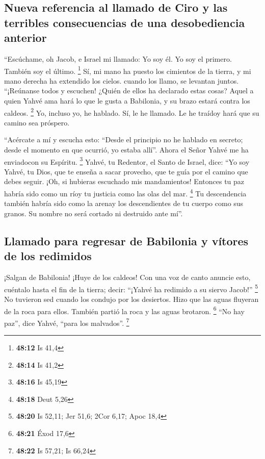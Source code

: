 \begin{paracol}{2}
\hypertarget{nueva-referencia-al-llamado-de-ciro-y-las-terribles-consecuencias-de-una-desobediencia-anterior}{%
\subsection{Nueva referencia al llamado de Ciro y las terribles
consecuencias de una desobediencia
anterior}\label{nueva-referencia-al-llamado-de-ciro-y-las-terribles-consecuencias-de-una-desobediencia-anterior}}

 ``Escúchame, oh Jacob, e Israel mi llamado: Yo soy él.
Yo soy el primero. También soy el último. \footnote{\textbf{48:12} Is
  41,4}  Sí, mi mano ha puesto los cimientos de la
tierra, y mi mano derecha ha extendido los cielos. cuando los llamo, se
levantan juntos.  ``¡Reúnanse todos y escuchen! ¿Quién de
ellos ha declarado estas cosas? Aquel a quien Yahvé ama hará lo que le
gusta a Babilonia, y su brazo estará contra los caldeos. \footnote{\textbf{48:14}
  Is 41,2}  Yo, incluso yo, he hablado. Sí, le he
llamado. Le he traídoy hará que su camino sea próspero.

 ``Acércate a mí y escucha esto: ``Desde el principio no
he hablado en secreto; desde el momento en que ocurrió, yo estaba
allí''. Ahora el Señor Yahvé me ha enviadocon su Espíritu. \footnote{\textbf{48:16}
  Is 45,19}  Yahvé, tu Redentor, el Santo de Israel,
dice: ``Yo soy Yahvé, tu Dios, que te enseña a sacar provecho, que te
guía por el camino que debes seguir.  ¡Oh, si hubieras
escuchado mis mandamientos! Entonces tu paz habría sido como un ríoy tu
justicia como las olas del mar. \footnote{\textbf{48:18} Deut 5,26}
 Tu descendencia también habría sido como la arenay los
descendientes de tu cuerpo como sus granos. Su nombre no será cortado ni
destruido ante mí''.

\hypertarget{llamado-para-regresar-de-babilonia-y-vuxedtores-de-los-redimidos}{%
\subsection{Llamado para regresar de Babilonia y vítores de los
redimidos}\label{llamado-para-regresar-de-babilonia-y-vuxedtores-de-los-redimidos}}

 ¡Salgan de Babilonia! ¡Huye de los caldeos! Con una voz
de canto anuncie esto, cuéntalo hasta el fin de la tierra; decir:
``¡Yahvé ha redimido a su siervo Jacob!'' \footnote{\textbf{48:20} Is
  52,11; Jer 51,6; 2Cor 6,17; Apoc 18,4}  No tuvieron sed
cuando los condujo por los desiertos. Hizo que las aguas fluyeran de la
roca para ellos. También partió la roca y las aguas brotaron.
\footnote{\textbf{48:21} Éxod 17,6}  ``No hay paz'', dice
Yahvé, ``para los malvados''. \footnote{\textbf{48:22} Is 57,21; Is
  66,24}


\end{paracol}
